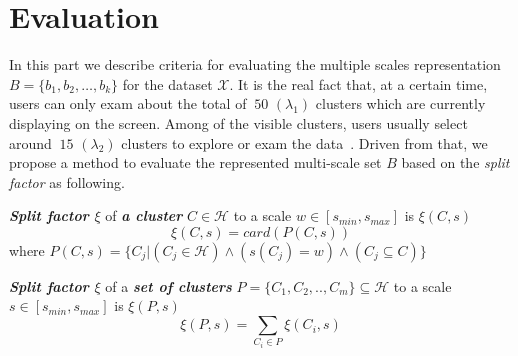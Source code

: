 \vspace{-2.5mm}
\section{Evaluation}
\label{sec:evaluation_scales}
\vspace{-1.85mm}
In this part we describe criteria for evaluating the multiple scales representation $\mathsf{\textit{B}} = \{b_1, b_2, \ldots, b_k\}$ for the dataset $\mathcal{X}$. It is the real fact that, at a certain time, users can only exam about the total of $~50$ $(\lambda_1)$ clusters which are currently displaying on the screen. Among of the visible clusters, users usually select around $~15$ $(\lambda_2)$ clusters to explore or exam the data~\cite{olivetti2013fast}. Driven from that, we propose a method to evaluate the represented multi-scale set $\mathsf{\textit{B}}$ based on the \textit{split factor} as following. 
\begin{definition}
\label{def:split_factor} \textbf{\textit{Split factor $\xi$}} of \textit{\textbf{a cluster}} $C \in \mathcal{H}$ to a scale $w \in [s_{min},s_{max}]$ is $\xi(C,s)$
\begin{equation}
\xi(C,s) = card(P(C,s))
\end{equation}
where $P(C,s) = \{ C_j | (C_j \in \mathcal{H}) \wedge (s(C_j) = w) \wedge (C_j \subseteq C) \}$ 
\end{definition}
\begin{definition}
\label{def:split_factor_set} \textbf{\textit{Split factor $\xi$}} of a \textit{\textbf{set of clusters}} $P=\{C_1, C_2,.., C_m\} \subseteq \mathcal{H}$ to a scale $s \in [s_{min},s_{max}]$ is $\xi(P,s)$
\begin{equation}
\xi(P,s) = \sum_{C_i \in P}\xi(C_i,s)
\end{equation}
\end{definition}
